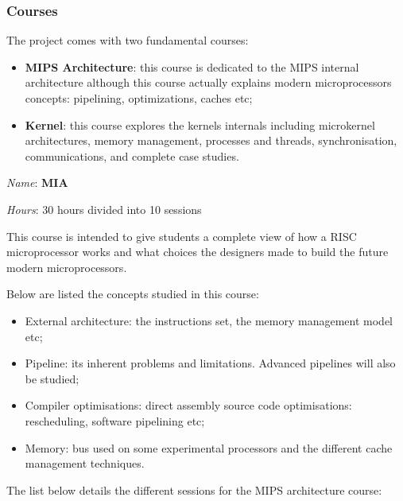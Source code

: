 \begin{multicols}{2}

\subsubsection{Courses}

The project comes with two fundamental courses:

\begin{itemize}
  \item
    \textbf{MIPS Architecture}: this course is dedicated to the MIPS internal
    architecture although this course actually explains modern microprocessors
    concepts: pipelining, optimizations, caches etc;
  \item
    \textbf{Kernel}: this course explores the kernels internals including
    microkernel architectures, memory management, processes and threads,
    synchronisation, communications, and complete case studies.
\end{itemize}


\textit{Name}: \textbf{MIA}

\textit{Hours}: 30 hours divided into 10 sessions

This course is intended to give students a complete view of how a RISC
microprocessor works and what choices the designers made to build the
future modern microprocessors.

Below are listed the concepts studied in this course:

\begin{itemize}
  \item
    External architecture: the instructions set, the memory management model
    etc;
  \item
    Pipeline: its inherent problems and limitations. Advanced pipelines will
    also be studied;
  \item
    Compiler optimisations: direct assembly source code optimisations:
    rescheduling, software pipelining etc;
  \item
    Memory: bus used on some experimental processors and the different cache
    management techniques.
\end{itemize}

The list below details the different sessions for the MIPS architecture
course:


\end{multicols}

